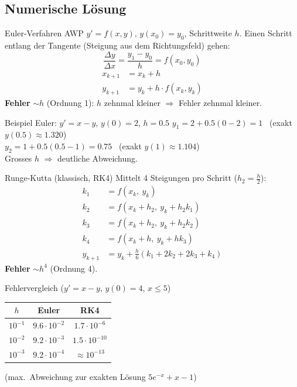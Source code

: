 \documentclass[a4paper, fontsize=7pt]{scrartcl}
\renewcommand*{\arraystretch}{1.5}  %
\begin{document}
\subsection{Numerische Lösung}

\begin{mainbox}{Euler-Verfahren}
AWP $y' = f(x, y)$, $y(x_0) = y_0$, Schrittweite $h$. Einen Schritt
entlang der Tangente (Steigung aus dem Richtungsfeld) gehen:
$$\frac{\Delta y}{\Delta x} = \frac{y_1 - y_0}{h} = f(x_0, y_0)$$
$$\boxed{\begin{aligned}x_{k+1} &= x_k + h\\
y_{k+1} &= y_k + h \cdot f(x_k, y_k)\end{aligned}}$$
\textbf{Fehler} $\sim h$ (Ordnung 1): $h$ zehnmal kleiner
$\Rightarrow$ Fehler zehnmal kleiner.
\end{mainbox}

\begin{subbox}{Beispiel Euler: $y' = x - y$, $y(0) = 2$, $h = 0.5$}
$y_1 = 2 + 0.5(0 - 2) = 1$ \ (exakt $y(0.5) \approx 1.320$)\\
$y_2 = 1 + 0.5(0.5 - 1) = 0.75$ \ (exakt $y(1) \approx 1.104$)\\
Grosses $h$ $\Rightarrow$ deutliche Abweichung.
\end{subbox}

\begin{mainbox}{Runge-Kutta (klassisch, RK4)}
Mittelt 4 Steigungen pro Schritt ($h_2 = \frac{h}{2}$):
\begin{align*}
k_1 &= f(x_k,\ y_k)\\
k_2 &= f(x_k + h_2,\ y_k + h_2 k_1)\\
k_3 &= f(x_k + h_2,\ y_k + h_2 k_2)\\
k_4 &= f(x_k + h,\ y_k + h k_3)\\
y_{k+1} &= y_k + \tfrac{h}{6}(k_1 + 2k_2 + 2k_3 + k_4)
\end{align*}
\textbf{Fehler} $\sim h^4$ (Ordnung 4).
\end{mainbox}

\begin{subbox}{Fehlervergleich ($y' = x - y$, $y(0) = 4$, $x \le 5$)}
\renewcommand*{\arraystretch}{1.3}
\begin{center}
\begin{tabular}{c|c|c}
$h$ & Euler & RK4 \\ \hline
$10^{-1}$ & $9.6 \cdot 10^{-2}$ & $1.7 \cdot 10^{-6}$ \\
$10^{-2}$ & $9.2 \cdot 10^{-3}$ & $1.5 \cdot 10^{-10}$ \\
$10^{-3}$ & $9.2 \cdot 10^{-4}$ & $\approx 10^{-13}$ \\
\end{tabular}
\end{center}
(max.\ Abweichung zur exakten Lösung $5e^{-x} + x - 1$)
\end{subbox}
\end{document}
